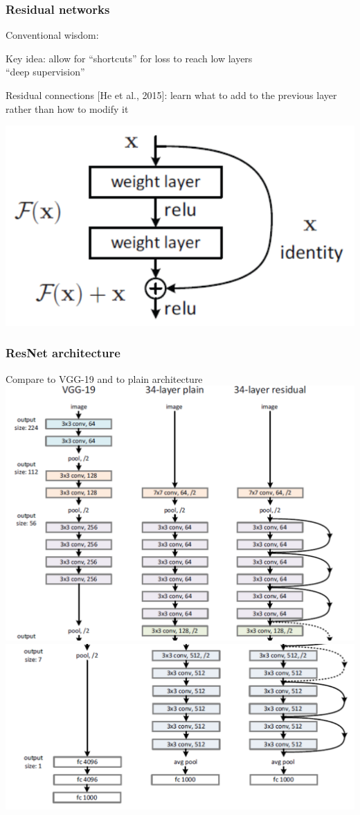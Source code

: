 \documentclass[xcolor=dvipsnames]{beamer}
\begin{document}
\begin{frame}
  \frametitle{Residual networks}
  \bi
\item Conventional wisdom: 
\item Key idea: allow for ``shortcuts'' for loss to reach low layers\\
``deep supervision''
\ei
\begin{minipage}[c]{.75\linewidth}
\bi

\item Residual connections [He et al., 2015]: learn what to add to the previous layer
  rather than how to modify it
\ei  
\end{minipage}%
\begin{minipage}[c]{.25\linewidth}
  \includegraphics[width=.95\textwidth]{resnet-block}
\end{minipage}

\end{frame}


\begin{frame}
  \frametitle{ResNet architecture}
 
\bi
\item Compare to VGG-19 and to plain architecture
\ei
\hspace{-1em}\includegraphics[width=.48\textwidth]{resnet-arch-top}\raisebox{5em}{\Large\bf \ldots}
\includegraphics[width=.48\textwidth]{resnet-arch-bottom}

\end{frame}
\end{document}
